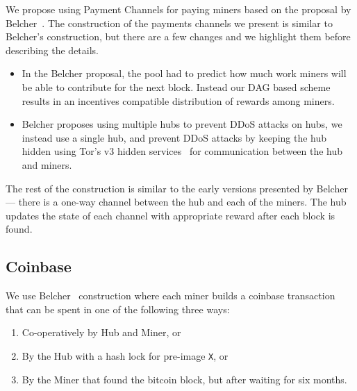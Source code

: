 \documentclass{article}
\begin{document}
We propose using Payment Channels for paying miners based on the
proposal by Belcher~\cite{channels-for-rewards}. The construction of
the payments channels we present is similar to Belcher's construction,
but there are a few changes and we highlight them before describing
the details.

\begin{itemize}
\item In the Belcher proposal, the pool had to predict how much work
  miners will be able to contribute for the next block. Instead our
  DAG based scheme results in an incentives compatible distribution of
  rewards among miners.
\item Belcher proposes using multiple hubs to prevent DDoS attacks on
  hubs, we instead use a single hub, and prevent DDoS attacks by
  keeping the hub hidden using Tor's v3 hidden
  services~\cite{tor-design} for communication between the hub and
  miners.
\end{itemize}

The rest of the construction is similar to the early versions
presented by Belcher --- there is a one-way channel between the hub
and each of the miners. The hub updates the state of each channel with
appropriate reward after each block is found.



\subsection{Coinbase}

We use Belcher~\cite{channels-for-rewards} construction where each
miner builds a coinbase transaction that can be spent in one of the
following three ways:

\begin{enumerate}
\item Co-operatively by Hub and Miner, or
\item By the Hub with a hash lock for pre-image \verb|X|, or
\item By the Miner that found the bitcoin block, but after waiting for
  six months.
\end{enumerate}
\end{document}
